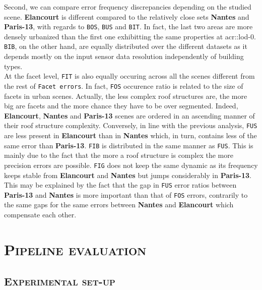         Second, we can compare error frequency discrepancies depending on the studied scene.
        \textbf{Elancourt} is different compared to the relatively close sets \textbf{Nantes} and \textbf{Paris-13}, with regards to \texttt{BOS}, \texttt{BUS} and \texttt{BIT}.
        In fact, the last two areas are more densely urbanized than the first one exhibitting the same properties at \gls{acr::lod}-0.
        \texttt{BIB}, on the other hand, are equally distributed over the different datasets as it depends mostly on the input sensor data resolution independently of building types.\\
        At the facet level, \texttt{FIT} is also equally occuring across all the scenes different from the rest of \texttt{Facet errors}.
        In fact, \texttt{FOS} occurence ratio is related to the size of facets in urban scenes.
        Actually, the less complex roof structures are, the more big are facets and the more chance they have to be over segmented.
        Indeed, \textbf{Elancourt}, \textbf{Nantes} and \textbf{Paris-13} scenes are ordered in an ascending manner of their roof structure complexity.
        Conversely, in line with the previous analysis, \texttt{FUS} are less present in \textbf{Elancourt} than in \textbf{Nantes} which, in turn, contains less of the same error than \textbf{Paris-13}.
        \texttt{FIB} is distributed in the same manner as \texttt{FUS}.
        This is mainly due to the fact that the more a roof structure is complex the more precision errors are possible.
        \texttt{FIG} does not keep the same dynamic as its frequency keeps stable from \textbf{Elancourt} and \textbf{Nantes} but jumps considerably in \textbf{Paris-13}.
        This may be explained by the fact that the gap in \texttt{FUS} error ratios between \textbf{Paris-13} and \textbf{Nantes} is more important than that of \texttt{FOS} errors, contrarily to the same gaps for the same errors between \textbf{Nantes} and \textbf{Elancourt} which compensate each other.

\section{\textsc{Pipeline evaluation}}
    \label{sec::experiments::evaluation}

    \subsection{\textsc{Experimental set-up}}
        \label{subsec::experiments::evaluation::setup}

